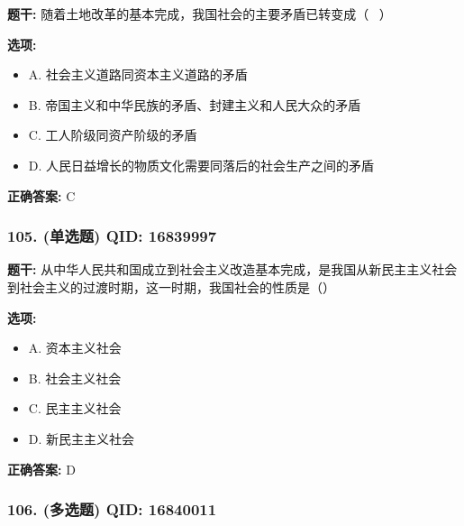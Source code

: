 \documentclass[12pt,UTF8]{ctexart}
\begin{document}
\textbf{题干:}
随着土地改革的基本完成，我国社会的主要矛盾已转变成（  ）

\textbf{选项:}
\begin{itemize}[leftmargin=*]

  \item A. 社会主义道路同资本主义道路的矛盾

  \item B. 帝国主义和中华民族的矛盾、封建主义和人民大众的矛盾

  \item C. 工人阶级同资产阶级的矛盾

  \item D. 人民日益增长的物质文化需要同落后的社会生产之间的矛盾

\end{itemize}

\textbf{正确答案:}
C

\vspace{0.3em}\hrulefill\vspace{0.7em}

\subsubsection*{105. (单选题) \small QID: 16839997}

\textbf{题干:}
从中华人民共和国成立到社会主义改造基本完成，是我国从新民主主义社会到社会主义的过渡时期，这一时期，我国社会的性质是（）

\textbf{选项:}
\begin{itemize}[leftmargin=*]

  \item A. 资本主义社会

  \item B. 社会主义社会

  \item C. 民主主义社会

  \item D. 新民主主义社会

\end{itemize}

\textbf{正确答案:}
D

\vspace{0.3em}\hrulefill\vspace{0.7em}

\subsubsection*{106. (多选题) \small QID: 16840011}
\end{document}
